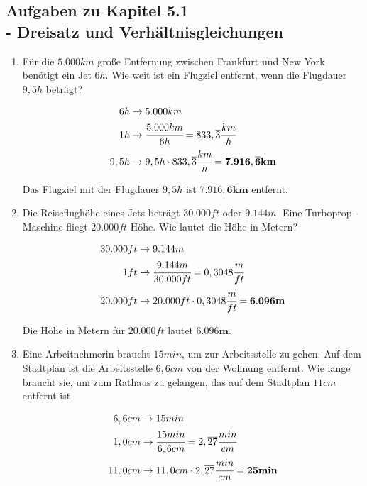 \documentclass[a4paper,10pt]{article} %
\begin{document}
\subsection{Aufgaben zu Kapitel 5.1 \\
  - Dreisatz und Verhältnisgleichungen}

\begin{enumerate}

  \item Für die \(5.000 km\) große Entfernung zwischen Frankfurt und New York
    benötigt ein Jet \(6 h\). Wie weit ist ein Flugziel entfernt,
    wenn die Flugdauer \(9,5 h\) beträgt?

    \[
      \begin{aligned}
        6 h &\rightarrow 5.000 km\\
        1 h &\rightarrow \cfrac{5.000 km}{6h} = 833,\overline{3}\cfrac{km}{h} \\
        9,5 h &\rightarrow 9,5 h \cdot 833,\overline{3}\cfrac{km}{h} = \mathbf{7.916,\overline{6} km} \\
      \end{aligned}
    \]

    Das Flugziel mit der Flugdauer \(9,5 h\) ist \(\mathbf{7.916,\overline{6}km}\) entfernt.

  \item Die Reiseflughöhe eines Jets beträgt \(30.000 ft\) oder \(9.144 m\).
    Eine Turboprop-Maschine fliegt \(20.000 ft\) Höhe. Wie lautet die Höhe in Metern?

    \[
      \begin{aligned}
        30.000 ft &\rightarrow 9.144 m \\
        1 ft &\rightarrow \cfrac{9.144 m}{30.000 ft} = 0,3048 \cfrac{m}{ft} \\
        20.000 ft &\rightarrow 20.000 ft \cdot 0,3048 \cfrac{m}{ft} = \mathbf{6.096m} \\
      \end{aligned}
    \]

    Die Höhe in Metern für \(20.000 ft\) lautet \(\mathbf{6.096m}\).

  \item Eine Arbeitnehmerin braucht \(15 min\), um zur Arbeitsstelle zu gehen.
    Auf dem Stadtplan ist die Arbeitsstelle \(6,6 cm\) von der Wohnung entfernt.
    Wie lange braucht sie, um zum Rathaus zu gelangen, das auf dem Stadtplan
    \(11 cm\) entfernt ist.

    \[
      \begin{aligned}
        6,6 cm &\rightarrow 15 min \\
        1,0 cm &\rightarrow \cfrac{15 min}{6,6 cm} = 2,\overline{27} \cfrac{min}{cm} \\
        11,0 cm &\rightarrow 11,0 cm \cdot 2,\overline{27} \cfrac{min}{cm} = \mathbf{25 min}
      \end{aligned}
    \]


\end{enumerate}
\end{document}
